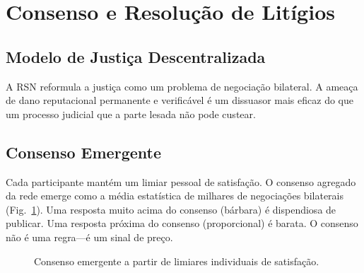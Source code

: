 \documentclass[11pt,a4paper,twocolumn]{article}
\begin{document}
\section{Consenso e Resolução de Litígios}

\subsection{Modelo de Justiça Descentralizada}

A RSN reformula a justiça como um problema de negociação bilateral. A ameaça de dano reputacional permanente e verificável é um dissuasor mais eficaz do que um processo judicial que a parte lesada não pode custear.

\subsection{Consenso Emergente}

Cada participante mantém um limiar pessoal de satisfação. O consenso agregado da rede emerge como a média estatística de milhares de negociações bilaterais (Fig.~\ref{fig:consensus}). Uma resposta muito acima do consenso (bárbara) é dispendiosa de publicar. Uma resposta próxima do consenso (proporcional) é barata. O consenso não é uma regra---é um sinal de preço.

\begin{figure}[ht]
\centering
{}
\caption{Consenso emergente a partir de limiares individuais de satisfação.}
\label{fig:consensus}
\end{figure}
\end{document}
